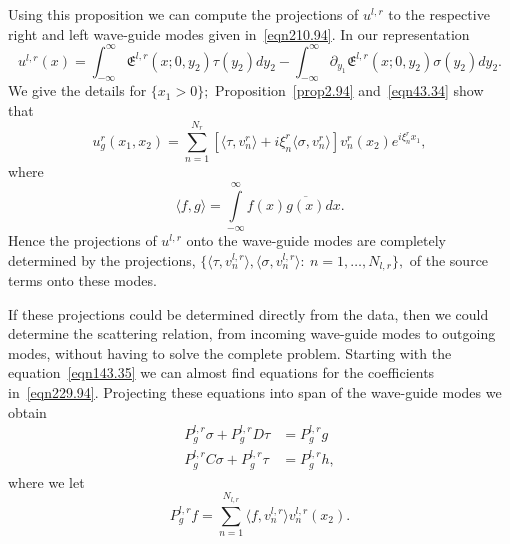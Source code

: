 \documentclass[11pt]{article}
\newcommand\fE{\mathfrak E}
\newcommand\pa{\partial}
\theoremstyle{definition}
\theoremstyle{remark}
\begin{document}
Using this proposition we can compute the projections of $u^{l,r}$ to the
respective right and left wave-guide modes given in~\eqref{eqn210.94}. In our
representation
\begin{equation}
  u^{l,r}(x)=\int_{-\infty}^{\infty}\fE^{l,r}(x;0,y_2)\tau(y_2)dy_2-\int_{-\infty}^{\infty}\pa_{y_1}\fE^{l,r}(x;0,y_2)\sigma(y_2)dy_2.
\end{equation}
We give the details for $\{x_1>0\};$ 
Proposition~\ref{prop2.94} and~\eqref{eqn43.34}  show that
\begin{equation}\label{eqn229.94}
  u_g^r(x_1,x_2)=\sum_{n=1}^{N_r}[\langle
    \tau,v_n^r\rangle+   i\xi_n^r\langle \sigma,v_n^r\rangle]v_n^r(x_2)e^{i\xi_n^r x_1},
\end{equation}
where
\begin{equation}
  \langle f,g\rangle=\int\limits_{-\infty}^{\infty}f(x)\overline{g(x)}dx.
\end{equation}
Hence the projections of $u^{l,r}$ onto the wave-guide modes are completely
determined by the projections, $\{\langle\tau,v_n^{l,r}\rangle,\langle
\sigma,v_n^{l,r}\rangle:\: n=1,\dots,N_{l,r}\},$ of the source terms onto these modes.

If these projections could be determined directly from the data, then we could
determine the scattering relation, from incoming wave-guide modes to outgoing
modes, without having to solve the complete problem. Starting with the
equation~\eqref{eqn143.35} we can almost find equations for the coefficients
in~\eqref{eqn229.94}.  Projecting these equations into span of the wave-guide
modes we obtain
\begin{equation}
  \begin{split}
    P^{l,r}_g\sigma+ P^{l,r}_g D\tau&=P^{l,r}_gg\\
     P^{l,r}_gC\sigma+ P^{l,r}_g \tau&=P^{l,r}_gh,
  \end{split}
\end{equation}
where we let
\begin{equation}
  P^{l,r}_gf=\sum_{n=1}^{N_{l,r}}\langle f,v_n^{l,r}\rangle v_n^{l,r}(x_2).
\end{equation}
\end{document}

